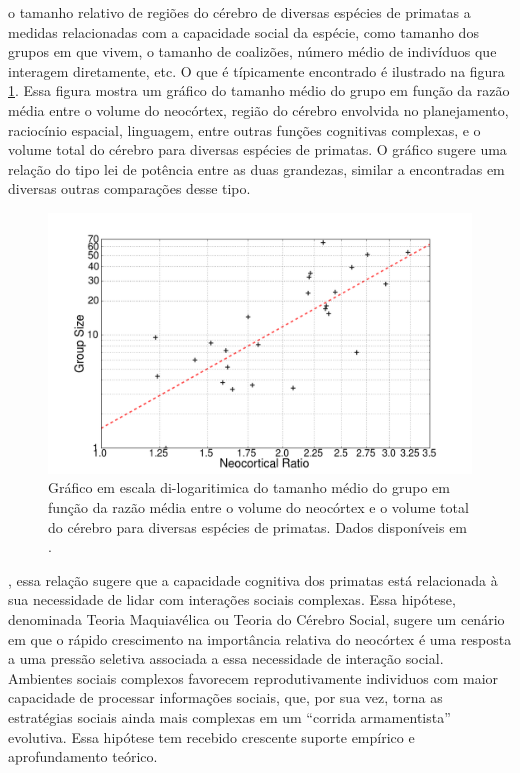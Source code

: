  o tamanho relativo de regiões do cérebro de diversas espécies de primatas a medidas relacionadas com a capacidade social da espécie, como tamanho dos grupos em que vivem, o tamanho de coalizões, número médio de indivíduos que interagem diretamente, etc. O que é típicamente encontrado é ilustrado na figura \ref{fig:dunbarlaw}. Essa figura mostra um gráfico do tamanho médio do grupo em função da razão média entre o volume do neocórtex, região do cérebro envolvida no planejamento, raciocínio espacial, linguagem, entre outras funções cognitivas complexas, e o volume total do cérebro para diversas espécies de primatas. O gráfico sugere uma relação do tipo lei de potência entre as duas grandezas, similar a encontradas em diversas outras comparações desse tipo. 
\\[3.5cm]
\begin{figure}
	\centering
	\includegraphics[width = \textwidth]{figuras/dunbar.png}
	\caption[Gráfico em escala di-logaritimica do tamanho médio do grupo em função da razão média entre o volume do neocórtex e o volume total do cérebro para diversas espécies de primatas.]{ Gráfico em escala di-logaritimica do tamanho médio do grupo em função da razão média entre o volume do neocórtex e o volume total do cérebro para diversas espécies de primatas. Dados disponíveis em \citep{Dunbar2009}.}
	\label{fig:dunbarlaw}
\end{figure}


\newpage

, essa relação sugere que a capacidade cognitiva dos primatas está relacionada à sua necessidade de lidar com interações sociais complexas. Essa hipótese, denominada Teoria Maquiavélica ou Teoria do Cérebro Social, sugere um cenário em que o rápido crescimento na importância relativa do neocórtex é uma resposta a uma pressão seletiva associada a essa necessidade de interação social\cite[-3cm]{Byrne1990,Byrne1991,Byrne1992, Whiten2012}. Ambientes sociais complexos favorecem reprodutivamente individuos com maior capacidade de processar informações sociais, que, por sua vez, torna as estratégias sociais ainda mais complexas em um ``corrida armamentista'' evolutiva. Essa hipótese tem recebido crescente suporte empírico e aprofundamento teórico\cite{Dunbar2008, Dunbar2009, Shultz2010}. 
\\[3ex]

